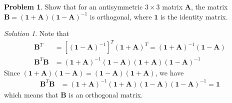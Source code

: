\documentclass[twoside,11pt]{article}
\newcommand{\lms}{\fontfamily{lmss}\selectfont} %
\theoremstyle{definition}
\newtheorem{problem}{\lms Problem}
\theoremstyle{remark}
\newtheorem*{solution}{\lms Solution}
\begin{document}
\begin{problem}
Show that for an antisymmetric $3\times 3$ matrix $\mathbf{A}$,
the matrix $\mathbf{B}=(\mathbf 1 + \mathbf A)(\mathbf 1 - \mathbf A)^{-1}$
is orthogonal, where $\mathbf 1$ is the identity matrix.
\end{problem}
\begin{solution}
Note that
\begin{align*}
    \mathbf B^T 
    &= 
    [(\mathbf 1 - \mathbf A)^{-1}]^T(\mathbf 1 + \mathbf A)^T
    = 
    (\mathbf 1 + \mathbf A)^{-1} (\mathbf 1 - \mathbf A)\\
    \mathbf B^T \mathbf B 
    &= 
    (\mathbf 1 + \mathbf A)^{-1} (\mathbf 1 - \mathbf A)
    (\mathbf 1 + \mathbf A)(\mathbf 1 - \mathbf A)^{-1}
\end{align*}
Since $(\mathbf 1 + \mathbf A)(\mathbf 1 - \mathbf A) = (\mathbf 1 - \mathbf A)(\mathbf 1 + \mathbf A)$,
we have
\begin{align*}
    \mathbf B^T \mathbf B &=
    (\mathbf 1 + \mathbf A)^{-1} 
    (\mathbf 1 + \mathbf A)
    (\mathbf 1 - \mathbf A)
    (\mathbf 1 - \mathbf A)^{-1}
    = \mathbf 1
\end{align*}
which means that $\mathbf{B}$ is an orthogonal matrix.
\end{solution}



\end{document}
